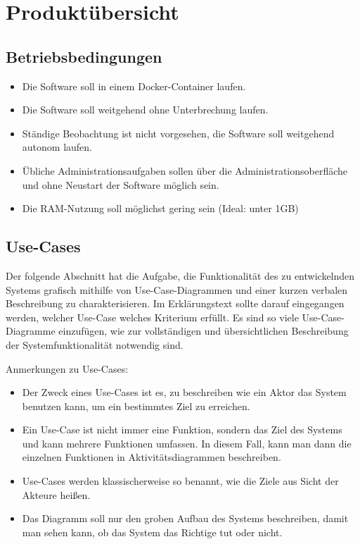 
\chapter{Produktübersicht}
\label{chap:product_overview}

\section{Betriebsbedingungen}
\iffalse Hier werden die unterschiedlichen Bedürfnisse und Anforderungen an das Produkt
aufgelistet. Dies können folgenden Punkte sein: \fi
\begin{itemize}
    \item Die Software soll in einem Docker-Container laufen.
    \item Die Software soll weitgehend ohne Unterbrechung laufen.
    \item Ständige Beobachtung ist nicht vorgesehen, die Software soll weitgehend autonom laufen.
    \item Übliche Administrationsaufgaben sollen über die Administrationsoberfläche und ohne Neustart der Software möglich sein.
    \item Die RAM-Nutzung soll möglichst gering sein (Ideal: unter 1GB)
\end{itemize}

\section{Use-Cases}

Der folgende Abschnitt hat die Aufgabe, die Funktionalität des zu entwickelnden
Systems grafisch mithilfe von Use-Case-Diagrammen und einer kurzen verbalen
Beschreibung zu charakterisieren. Im Erklärungstext sollte darauf eingegangen werden,
welcher Use-Case welches Kriterium erfüllt. Es sind so viele Use-Case-Diagramme einzufügen,
wie zur vollständigen und übersichtlichen Beschreibung der Systemfunktionalität
notwendig sind.

Anmerkungen zu Use-Cases:

\begin{itemize}
	\item Der Zweck eines Use-Cases ist es, zu beschreiben wie ein Aktor das System benutzen kann,
	 	um ein bestimmtes Ziel zu erreichen.
	\item Ein Use-Case ist nicht immer eine Funktion, sondern das Ziel des Systems und kann mehrere 
		Funktionen umfassen.
		In diesem Fall, kann man dann die einzelnen Funktionen in Aktivitätsdiagrammen beschreiben.
	\item Use-Cases werden klassischerweise so benannt, wie die Ziele aus Sicht der Akteure heißen.
	\item Das Diagramm soll nur den groben Aufbau des Systems beschreiben, damit man sehen kann,
		 ob das System das Richtige tut oder nicht.
\end{itemize}


